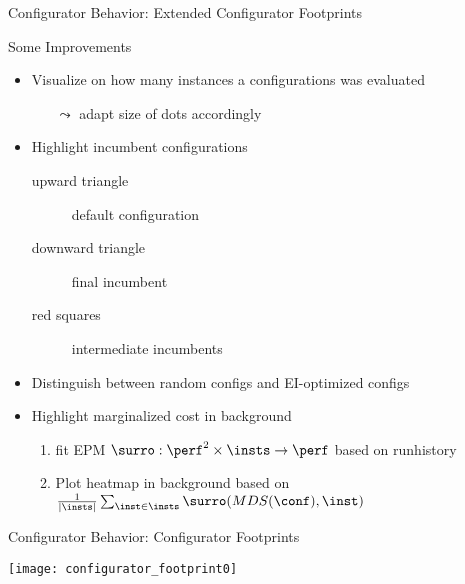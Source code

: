\begin{frame}[c]{Configurator Behavior: Extended Configurator Footprints}

\begin{block}{Some Improvements}
\begin{itemize}
  \item Visualize on how many instances a configurations was evaluated
  \begin{itemize}
	\item[$\leadsto$] adapt size of dots accordingly     
  \end{itemize}
  \pause
  \medskip
  \item Highlight incumbent configurations 
  \begin{description}
	\item[upward triangle] default configuration
	\item[downward triangle] final incumbent
	\item[red squares] intermediate incumbents 
  \end{description}
  \pause
  \medskip
  \item Distinguish between random configs and EI-optimized configs
  \pause
  \medskip
  \item Highlight marginalized cost in background
  \begin{enumerate}
    \item fit EPM $\surro: \perf^2 \times \insts \to \perf$ based on runhistory
    \item Plot heatmap in background based on $\frac{1}{|\insts|}\sum_{\inst \in \insts}\surro(MDS(\conf),\inst)$
  \end{enumerate}
\end{itemize}
\end{block}

\end{frame}
\begin{frame}[c]{Configurator Behavior: Configurator Footprints}

\centering
\texttt{[image: configurator\_footprint0]}

\end{frame}

